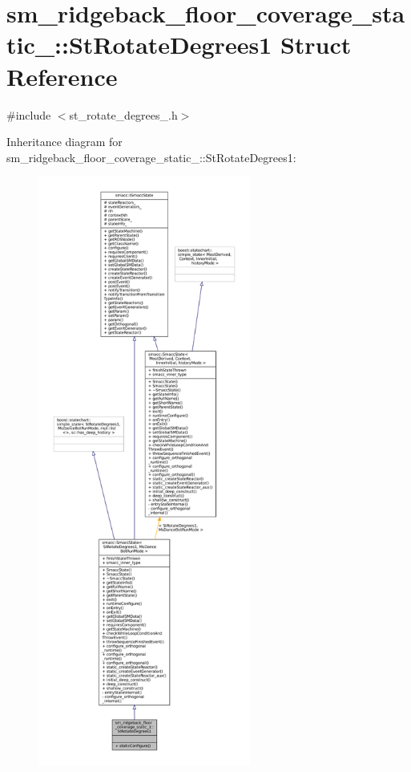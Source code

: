 \hypertarget{structsm__ridgeback__floor__coverage__static__1_1_1StRotateDegrees1}{}\section{sm\+\_\+ridgeback\+\_\+floor\+\_\+coverage\+\_\+static\+\_\+:\+:St\+Rotate\+Degrees1 Struct Reference}
\label{structsm__ridgeback__floor__coverage__static__1_1_1StRotateDegrees1}


{\ttfamily \#include $<$st\+\_\+rotate\+\_\+degrees\+\_.\+h$>$}



Inheritance diagram for sm\+\_\+ridgeback\+\_\+floor\+\_\+coverage\+\_\+static\+\_\+:\+:St\+Rotate\+Degrees1\+:
\nopagebreak
\begin{figure}[H]
\begin{center}
\leavevmode
\includegraphics[height=550pt]{structsm__ridgeback__floor__coverage__static__1_1_1StRotateDegrees1__inherit__graph}
\end{center}
\end{figure}


